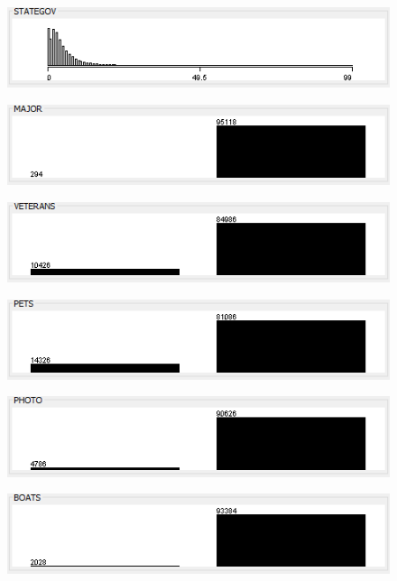 \begin{figure}
\includegraphics{./images/expl_rep/Cattura2-00-02}
\end{figure}
\begin{figure}
\includegraphics{./images/expl_rep/Cattura2-00-03}
\end{figure}
\begin{figure}
\includegraphics{./images/expl_rep/Cattura2-00-04}
\end{figure}
\begin{figure}
\includegraphics{./images/expl_rep/Cattura2-00-05}
\end{figure}
\begin{figure}
\includegraphics{./images/expl_rep/Cattura2-00-06}
\end{figure}
\begin{figure}
\includegraphics{./images/expl_rep/Cattura2-00-07}
\end{figure}
